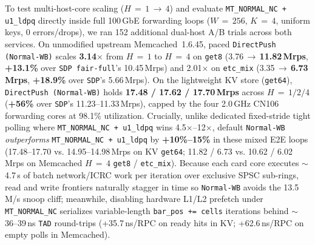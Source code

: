 To test multi-host-core scaling ($H\,=\,1\,\to\,4$) and evaluate \texttt{MT\_NORMAL\_NC + u1\_ldpq} directly inside full 100\,GbE forwarding loops ($W\,=\,256$, $K\,=\,4$, uniform keys, 0 errors/drops), we ran 152 additional dual-host A/B trials across both services. On unmodified upstream Memcached~1.6.45, paced \texttt{DirectPush (Normal-WB)} scales \textbf{3.14$\times$} from $H\,=\,1$ to $H\,=\,4$ on \texttt{get8} (3.76\,$\to$\,\textbf{11.82\,Mrps}, \textbf{+13.1\%} over \texttt{SDP fair-full}'s 10.45\,Mrps) and 2.01$\times$ on \texttt{etc\_mix} (3.35\,$\to$\,\textbf{6.73\,Mrps}, \textbf{+18.9\%} over \texttt{SDP}'s 5.66\,Mrps). On the lightweight KV store (\texttt{get64}), \texttt{DirectPush (Normal-WB)} holds \textbf{17.48 / 17.62 / 17.70\,Mrps} across $H\,=\,1/2/4$ (\textbf{+56\%} over \texttt{SDP}'s 11.23--11.33\,Mrps), capped by the four 2.0\,GHz CN106 forwarding cores at 98.1\% utilization. Crucially, unlike dedicated fixed-stride tight polling where \texttt{MT\_NORMAL\_NC + u1\_ldpq} wins 4.5$\times$--12$\times$, default \texttt{Normal-WB} \emph{outperforms} \texttt{MT\_NORMAL\_NC + u1\_ldpq} by \textbf{+10\%--15\%} in these mixed E2E loops (17.48--17.70 vs. 14.95--14.98\,Mrps on KV \texttt{get64}; 11.82 / 6.73 vs. 10.62 / 6.02\,Mrps on Memcached $H\,=\,4$ \texttt{get8} / \texttt{etc\_mix}). Because each card core executes $\sim$4.7\,\textmu s of batch network/ICRC work per iteration over exclusive SPSC sub-rings, read and write frontiers naturally stagger in time so \texttt{Normal-WB} avoids the 13.5\,M/s snoop cliff; meanwhile, disabling hardware L1/L2 prefetch under \texttt{MT\_NORMAL\_NC} serializes variable-length \texttt{bar\_pos += cells} iterations behind $\sim$36--39\,ns \texttt{TAD} round-trips (+35.7\,ns/RPC on ready hits in KV; +62.6\,ns/RPC on empty polls in Memcached).

